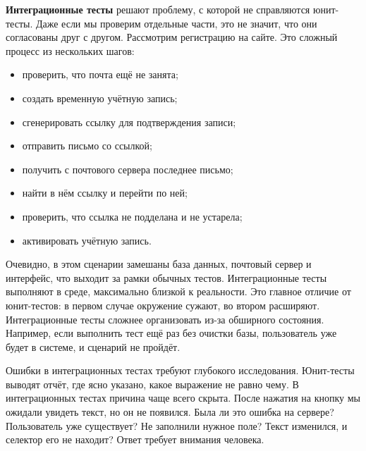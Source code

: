 
\textbf{Интеграционные тесты} решают проблему, с которой не справляются
юнит-тесты. Даже если мы проверим отдельные части, это не значит, что они
согласованы друг с другом. Рассмотрим регистрацию на сайте. Это сложный процесс
из нескольких шагов:

\begin{itemize}

\item
  проверить, что почта ещё не занята;

\item
  создать временную учётную запись;

\item
  сгенерировать ссылку для подтверждения записи;

\item
  отправить письмо со ссылкой;

\item
  получить с почтового сервера последнее письмо;

\item
  найти в нём ссылку и перейти по ней;

\item
  проверить, что ссылка не подделана и не устарела;

\item
  активировать учётную запись.

\end{itemize}

Очевидно, в этом сценарии замешаны база данных, почтовый сервер и интерфейс, что
выходит за рамки обычных тестов. Интеграционные тесты выполняют в среде,
максимально близкой к реальности. Это главное отличие от юнит-тестов: в первом
случае окружение сужают, во втором расширяют. Интеграционные тесты сложнее
организовать из-за обширного состояния. Например, если выполнить тест ещё раз
без очистки базы, пользователь уже будет в системе, и сценарий не пройдёт.

Ошибки в интеграционных тестах требуют глубокого исследования. Юнит-тесты
выводят отчёт, где ясно указано, какое выражение не равно чему. В интеграционных
тестах причина чаще всего скрыта. После нажатия на кнопку мы ожидали увидеть
текст, но он не появился. Была ли это ошибка на сервере?  Пользователь уже
существует? Не заполнили нужное поле? Текст изменился, и селектор его не
находит? Ответ требует внимания человека.


